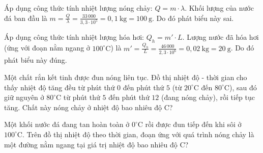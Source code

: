 \begin{ex}
{\begin{itemchoice}
			\item Áp dụng công thức tính nhiệt lượng nóng chảy: $Q = m \cdot \lambda$. Khối lượng của nước đá ban đầu là $m = \frac{Q}{\lambda} = \frac{33\,000}{3{,}3 \cdot 10^5} = 0{,}1\ \mathrm{kg} = 100\ \mathrm{g}$. Do đó phát biểu này sai.
			\item Áp dụng công thức tính nhiệt lượng hóa hơi: $Q_h = m' \cdot L$. Lượng nước đã hóa hơi (ứng với đoạn nằm ngang ở $100^\circ \mathrm{C}$) là $m' = \frac{Q_h}{L} = \frac{46\,000}{2{,}3 \cdot 10^6} = 0{,}02\ \mathrm{kg} = 20\ \mathrm{g}$. Do đó phát biểu này đúng.
		\end{itemchoice}
	}
\end{ex}

\begin{bt}
	{\color{red}\footnotesize\ttfamily [L12C1B1-TLN-10]}\par %
	Một chất rắn kết tinh được đun nóng liên tục. Đồ thị nhiệt độ - thời gian cho thấy nhiệt độ tăng đều từ phút thứ $0$ đến phút thứ $5$ (từ $20^\circ\mathrm{C}$ đến $80^\circ\mathrm{C}$), sau đó giữ nguyên ở $80^\circ\mathrm{C}$ từ phút thứ $5$ đến phút thứ $12$ (đang nóng chảy), rồi tiếp tục tăng. Chất này nóng chảy ở nhiệt độ bao nhiêu độ $\mathrm{C}$?
\end{bt}

\begin{bt}
	{\color{red}\footnotesize\ttfamily [L12C1B1-TLN-11]}\par %
	Một khối nước đá đang tan hoàn toàn ở $0^\circ\mathrm{C}$ rồi được đun tiếp đến khi sôi ở $100^\circ\mathrm{C}$. Trên đồ thị nhiệt độ theo thời gian, đoạn ứng với quá trình nóng chảy là một đường nằm ngang tại giá trị nhiệt độ bao nhiêu độ $\mathrm{C}$?
\end{bt}

